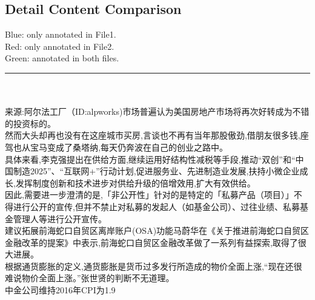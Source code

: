 \documentclass[runningheads,a4paper]{llncs}
\begin{document}
\begin{CJK*}{UTF8}{gbsn}
\section{Detail Content Comparison}
\colorbox{blue!30}{Blue}: only annotated in File1.\\
\colorbox{red!30}{Red}: only annotated in File2.\\
\colorbox{green!30}{Green}: annotated in both files.\\
\rule{5cm}{0.1em}\\
\vspace{0.3cm}\\
来源:\colorbox{green!30}{阿尔法工厂}（ID:\colorbox{blue!30}{alpworks})\colorbox{red!30}{市场}普遍认为\colorbox{green!30}{美国房地产市场}将再次好转成为不错的\colorbox{green!30}{投资标的}。\\
然而\colorbox{green!30}{大头}却再也没有在这座\colorbox{blue!30}{城市}买房,\colorbox{red!30}{言谈}也不再有当年那股傲劲,借朋友很多钱,座驾也从\colorbox{green!30}{宝马}变成了\colorbox{green!30}{桑塔纳},每天仍奔波在自己的创业之路中。\\
具体来看,\colorbox{green!30}{李克强}提出在\colorbox{blue!30}{供给}方面,继续运用好\colorbox{green!30}{结构性减税}等手段,推动“\colorbox{green!30}{双创}”和“\colorbox{green!30}{中国制造2025}”、“\colorbox{green!30}{互联网+}”行动计划,促进\colorbox{green!30}{服务业}、\colorbox{green!30}{先进制造业}发展,扶持\colorbox{green!30}{小微企业}成长,发挥制度创新和技术进步对\colorbox{blue!30}{供给升级}的倍增效用,扩大有效供给。\\
因此,需要进一步澄清的是,「非公开性」针对的是特定的「\colorbox{green!30}{私募产品}（项目）」不得进行公开的宣传,但并不禁止对\colorbox{green!30}{私募}的\colorbox{green!30}{发起人}（如\colorbox{green!30}{基金公司}）、\colorbox{blue!30}{过往}\colorbox{green!30}{业绩}、\colorbox{green!30}{私募基金管理人}等进行公开宣传。\\
建议\colorbox{red!30}{拓展}\colorbox{green!30}{前海蛇口自贸区}\colorbox{blue!30}{离岸账户}(\colorbox{blue!30}{OSA})功能\colorbox{green!30}{马蔚华}在《\colorbox{green!30}{关于推进前海蛇口自贸区金融改革的提案}》中表示,\colorbox{green!30}{前海蛇口自贸区金融改革}做了一系列有益探索,取得了很大进展。\\
根据\colorbox{green!30}{通货膨胀}的定义,\colorbox{green!30}{通货膨胀}是\colorbox{green!30}{货币}\colorbox{blue!30}{过多发行}所造成的\colorbox{green!30}{物价}全面上涨,“现在还很难说\colorbox{green!30}{物价}全面上涨。”\colorbox{green!30}{张世贤}的判断不无道理。\\
\colorbox{green!30}{中金公司}维持2016年\colorbox{green!30}{CPI}为1.9%

\end{CJK*}
\end{document}
